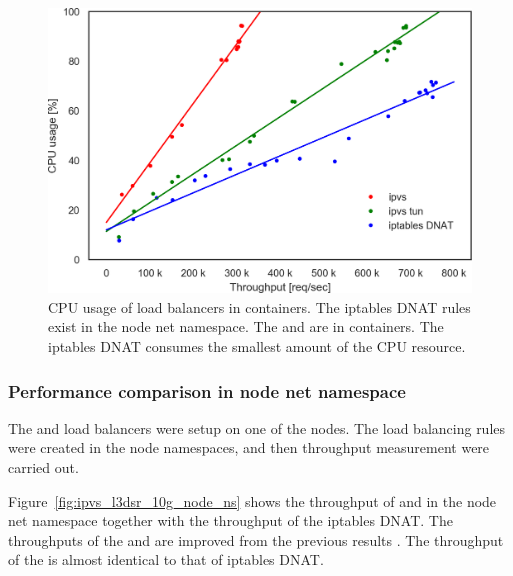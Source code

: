 \begin{figure}[h]
  \centering
  \includegraphics[width=0.8\columnwidth]{Figs/cpu_usage_10g}
  \par\bigskip
  \centering
  \begin{minipage}{0.9\columnwidth}
    \caption[CPU usage of load balancers in containers]{
      CPU usage of load balancers in containers.
      The iptables DNAT rules exist in the node net namespace.
      The  and  are in containers.
      The iptables DNAT consumes the smallest amount of the CPU resource.
    }
    \label{fig:cpu_usage_10g}
  \end{minipage}
\end{figure}

\FloatBarrier

\subsubsection{Performance comparison in node net namespace}

The  and  load balancers were setup on one of the nodes. 
The load balancing rules were created in the node namespaces, and then throughput measurement were carried out.

Figure~\ref{fig:ipvs_l3dsr_10g_node_ns} shows the throughput of  and  in the node net namespace together with the throughput of the iptables DNAT.
The throughputs of the  and  are improved from the previous results .
%
The throughput of the  is almost identical to that of iptables DNAT.

